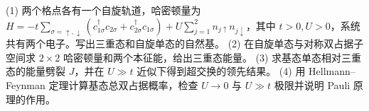 (1) 两个格点各有一个自旋轨道，哈密顿量为 \(H=-t\sum_{\sigma=\uparrow,\downarrow}(c_{1\sigma}^\dagger c_{2\sigma}+c_{2\sigma}^\dagger c_{1\sigma})+U\sum_{j=1}^2 n_{j\uparrow}n_{j\downarrow}\)，其中 \(t>0,U>0\)，系统共有两个电子。写出三重态和自旋单态的自然基。
(2) 在自旋单态与对称双占据子空间求 \(2\times2\) 哈密顿量和两个本征能，给出三重态能量。
(3) 求基态单态相对三重态的能量劈裂 \(J\)，并在 \(U\gg t\) 近似下得到超交换的领先结果。
(4) 用 Hellmann–Feynman 定理计算基态总双占据概率，检查 \(U\to0\) 与 \(U\gg t\) 极限并说明 Pauli 原理的作用。
